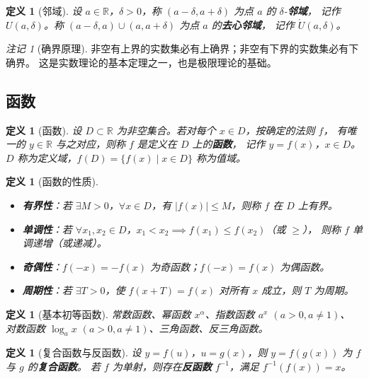 \documentclass[12pt,a4paper]{ctexart}
\newtheorem{definition}[theorem]{定义}
\theoremstyle{remark}
\newtheorem{remark}{注记}[section]
\begin{document}
\begin{definition}[邻域]
设 $a \in \mathbb{R}$，$\delta > 0$，称 $(a-\delta, a+\delta)$ 为点 $a$ 的 $\delta$-\textbf{邻域}，
记作 $U(a,\delta)$。称 $(a-\delta, a) \cup (a, a+\delta)$ 为点 $a$ 的\textbf{去心邻域}，
记作 $\mathring{U}(a,\delta)$。
\end{definition}

\begin{remark}[确界原理]
非空有上界的实数集必有上确界；非空有下界的实数集必有下确界。
这是实数理论的基本定理之一，也是极限理论的基础。
\end{remark}

\subsection{函数}

\begin{definition}[函数]
设 $D \subset \mathbb{R}$ 为非空集合。若对每个 $x \in D$，按确定的法则 $f$，
有唯一的 $y \in \mathbb{R}$ 与之对应，则称 $f$ 是定义在 $D$ 上的\textbf{函数}，
记作 $y = f(x)$，$x \in D$。$D$ 称为定义域，$f(D) = \{f(x) \mid x \in D\}$ 称为值域。
\end{definition}

\begin{definition}[函数的性质]
\begin{itemize}
  \item \textbf{有界性}：若 $\exists M > 0$，$\forall x \in D$，有 $|f(x)| \le M$，则称 $f$ 在 $D$ 上有界。
  \item \textbf{单调性}：若 $\forall x_1,x_2 \in D$，$x_1 < x_2 \implies f(x_1) \le f(x_2)$（或 $\ge$），
    则称 $f$ 单调递增（或递减）。
  \item \textbf{奇偶性}：$f(-x) = -f(x)$ 为奇函数；$f(-x) = f(x)$ 为偶函数。
  \item \textbf{周期性}：若 $\exists T > 0$，使 $f(x+T) = f(x)$ 对所有 $x$ 成立，则 $T$ 为周期。
\end{itemize}
\end{definition}

\begin{definition}[基本初等函数]
常数函数、幂函数 $x^{\alpha}$、指数函数 $a^x$ $(a>0,a\neq 1)$、
对数函数 $\log_a x$ $(a>0,a\neq 1)$、三角函数、反三角函数。
\end{definition}

\begin{definition}[复合函数与反函数]
设 $y = f(u)$，$u = g(x)$，则 $y = f(g(x))$ 为 $f$ 与 $g$ 的\textbf{复合函数}。
若 $f$ 为单射，则存在\textbf{反函数} $f^{-1}$，满足 $f^{-1}(f(x)) = x$。
\end{definition}
\end{document}
